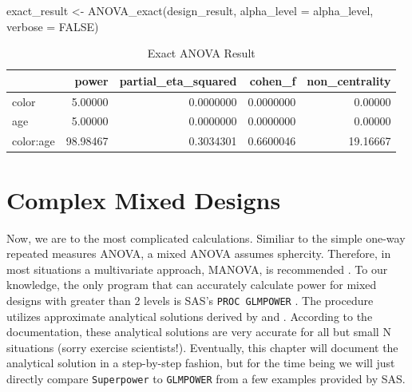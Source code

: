 \documentclass[
]{book}
\newenvironment{Shaded}{\begin{snugshade}}{\end{snugshade}}
\newcommand{\AttributeTok}[1]{\textcolor[rgb]{0.77,0.63,0.00}{#1}}
\newcommand{\ConstantTok}[1]{\textcolor[rgb]{0.00,0.00,0.00}{#1}}
\newcommand{\FunctionTok}[1]{\textcolor[rgb]{0.00,0.00,0.00}{#1}}
\newcommand{\NormalTok}[1]{#1}
\newcommand{\OtherTok}[1]{\textcolor[rgb]{0.56,0.35,0.01}{#1}}
\begin{document}
\begin{Shaded}
\begin{Highlighting}[]
\NormalTok{exact\_result }\OtherTok{\textless{}{-}} \FunctionTok{ANOVA\_exact}\NormalTok{(design\_result,}
                            \AttributeTok{alpha\_level =}\NormalTok{ alpha\_level,}
                            \AttributeTok{verbose =} \ConstantTok{FALSE}\NormalTok{)}
\end{Highlighting}
\end{Shaded}

\begin{table}[!h]

\caption{\label{tab:unnamed-chunk-159}Exact ANOVA Result}
\centering
\begin{tabular}[t]{l|r|r|r|r}
\hline
  & power & partial\_eta\_squared & cohen\_f & non\_centrality\\
\hline
color & 5.00000 & 0.0000000 & 0.0000000 & 0.00000\\
\hline
age & 5.00000 & 0.0000000 & 0.0000000 & 0.00000\\
\hline
color:age & 98.98467 & 0.3034301 & 0.6600046 & 19.16667\\
\hline
\end{tabular}
\end{table}

\newpage

\hypertarget{complex-mixed-designs}{%
\section{Complex Mixed Designs}\label{complex-mixed-designs}}

Now, we are to the most complicated calculations. Similiar to the simple one-way repeated measures ANOVA, a mixed ANOVA assumes sphercity. Therefore, in most situations a multivariate approach, MANOVA, is recommended \citep{maxwell_designing_2004}. To our knowledge, the only program that can accurately calculate power for mixed designs with greater than 2 levels is SAS's \texttt{PROC\ GLMPOWER} \citep{SASglmpower}. The procedure utilizes approximate analytical solutions derived by \citet{muller1984practical} and \citet{o1999pragmatic}. According to the documentation, these analytical solutions are very accurate for all but small N situations (sorry exercise scientists!). Eventually, this chapter will document the analytical solution in a step-by-step fashion, but for the time being we will just directly compare \texttt{Superpower} to \texttt{GLMPOWER} from a few examples provided by SAS.
\end{document}
